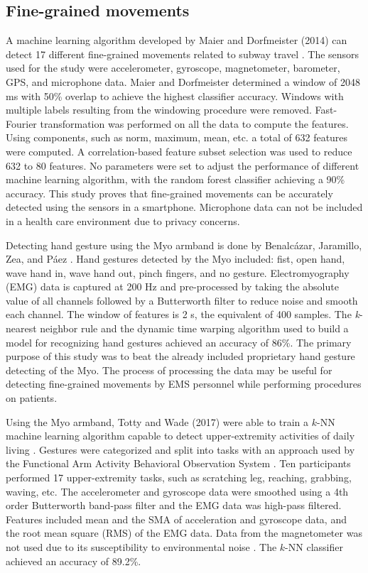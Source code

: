\subsection{Fine-grained movements}
A machine learning algorithm developed by Maier and Dorfmeister (2014) can detect 17 different fine-grained movements related to subway travel \cite{Dorfmeister2014}. The sensors used for the study were accelerometer, gyroscope, magnetometer, barometer, GPS, and microphone data. Maier and Dorfmeister determined a window of 2048 ms with 50\% overlap to achieve the highest classifier accuracy. Windows with multiple labels resulting from the windowing procedure were removed. Fast-Fourier transformation was performed on all the data to compute the features. Using components, such as norm, maximum, mean, etc. a total of 632 features were computed. A correlation-based feature subset selection was used to reduce 632 to 80 features. No parameters were set to adjust the performance of different machine learning algorithm, with the random forest classifier achieving a 90\% accuracy. This study proves that fine-grained movements can be accurately detected using the sensors in a smartphone. Microphone data can not be included in a health care environment due to privacy concerns.
\par Detecting hand gesture using the Myo armband is done by Benalc{\'{a}}zar, Jaramillo, Zea, and P{\'{a}}ez \cite{Benalcazar2017}. Hand gestures detected by the Myo included: fist, open hand, wave hand in, wave hand out, pinch fingers, and no gesture. Electromyography (\gls{EMG}) data is captured at 200 Hz and pre-processed by taking the absolute value of all channels followed by a Butterworth filter to reduce noise and smooth each channel. The window of features is 2 s, the equivalent of 400 samples. The \emph{k}-nearest neighbor rule and the dynamic time warping algorithm used to build a model for recognizing hand gestures achieved an accuracy of 86\%. The primary purpose of this study was to beat the already included proprietary hand gesture detecting of the Myo. The process of processing the data may be useful for detecting fine-grained movements by EMS personnel while performing procedures on patients.
\par Using the Myo armband, Totty and Wade (2017) were able to train a $k$-NN machine learning algorithm capable to detect upper-extremity activities of daily living \cite{Totty2017}. Gestures were categorized and split into tasks with an approach used by the Functional Arm Activity Behavioral Observation System \cite{FAABOS}. Ten participants performed 17 upper-extremity tasks, such as scratching leg, reaching, grabbing, waving, etc. The accelerometer and gyroscope data were smoothed using a 4th order Butterworth band-pass filter and the EMG data was high-pass filtered. Features included mean and the \gls{SMA} of acceleration and gyroscope data, and the root mean square (\gls{RMS}) of the \gls{EMG} data. Data from the magnetometer was not used due to its susceptibility to environmental noise \cite{Ahmad2013}. The $k$-NN classifier achieved an accuracy of 89.2\%.
